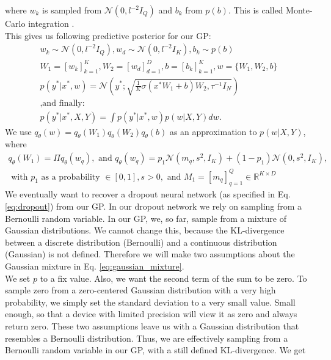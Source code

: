 \documentclass[a4paper,cleardoubleempty,BCOR1cm, 11pt]{report}
\begin{document}
where $w_k$ is sampled from $\mathcal{N}(0, l^{-2}I_Q)$ and $b_k$ from $p(b)$. This is called Monte-Carlo integration \cite{metropolis1949monte}.\\
This gives us following predictive posterior for our GP:
\begin{align*}
w_k \sim \mathcal{N}(0, l^{-2}I_Q), w_d \sim \mathcal{N}(0, l^{-2} I_K), b_k \sim p(b)\\
W_1 = \left[ w_k \right]^{K}_{k=1}, W_2 = \left[ w_d \right]^D_{d=1}, b = \left[ b_k \right]^K_{k=1}, w = \lbrace W_1, W_2, b \rbrace\\
p(y^*|x^*, w) = \mathcal{N} \left( y^*; \sqrt{\frac{1}{K}\sigma(x^* W_1 + b)W_2, \tau^{-1}I_N}\right)\\
\text{,and finally:}\hspace{150pt}\\
p(y^*|x^*, X,Y) = \int p(y^*|x^*, w)p(w|X,Y)dw.
\end{align*}
We use $q_{\theta}(w) = q_{\theta}(W_1)q_{\theta}(W_2)q_{\theta}(b)$ as an approximation to $p(w|X,Y)$, where
\begin{align}\label{eq:gaussian_mixture}
q_{\theta}(W_1) = \Pi q_{\theta}(w_q), \text{ and } q_{\theta}(w_q) = p_1\mathcal{N}(m_q, s^2, I_K) + (1-p_1) \mathcal{N}(0, s^2, I_K),\\
\text{ with } p_1 \text{ as a probability }\in \left[ 0, 1\right], s > 0, \text{ and }M_1 = \left[ m_q \right]^Q_{q=1} \in \mathbb{R}^{K\times D}
\end{align}
We eventually want to recover a dropout neural network (as specified in Eq. \ref{eq:dropout}) from our GP. In our dropout network we rely on sampling from a Bernoulli random variable. In our GP, we, so far, sample from a mixture of Gaussian distributions. We cannot change this, because the KL-divergence between a discrete distribution (Bernoulli) and a continuous distribution (Gaussian) is not defined. Therefore we will make two assumptions about the Gaussian mixture in Eq. \ref{eq:gaussian_mixture}.\\
We set $p$ to a fix value. Also, we want the second term of the sum to be zero. To sample zero from a zero-centered Gaussian distribution with a very high probability, we simply set the standard deviation to a very small value. Small enough, so that a device with limited precision will view it as zero and always return zero. These two assumptions leave us with a Gaussian distribution that resembles a Bernoulli distribution. Thus, we are effectively sampling from a Bernoulli random variable in our GP, with a still defined KL-divergence. We get
\end{document}
